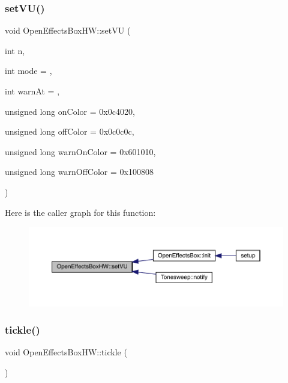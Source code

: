 \subsubsection{\texorpdfstring{set\+V\+U()}{setVU()}}
{\footnotesize\ttfamily void Open\+Effects\+Box\+H\+W\+::set\+VU (\begin{DoxyParamCaption}\item[{int}]{n,  }\item[{int}]{mode = {},  }\item[{int}]{warn\+At = {},  }\item[{unsigned long}]{on\+Color = {\ttfamily 0x0c4020},  }\item[{unsigned long}]{off\+Color = {\ttfamily 0x0c0c0c},  }\item[{unsigned long}]{warn\+On\+Color = {\ttfamily 0x601010},  }\item[{unsigned long}]{warn\+Off\+Color = {\ttfamily 0x100808} }\end{DoxyParamCaption})}

Here is the caller graph for this function\+:\nopagebreak
\begin{figure}[H]
\begin{center}
\leavevmode
\includegraphics[width=350pt]{class_open_effects_box_h_w_a9313d16771542c43c7782c19046caa8d_icgraph}
\end{center}
\end{figure}
\mbox{\label{class_open_effects_box_h_w_a4623ed8f605ab7d6a4abedf6879f06ac}} 
\subsubsection{\texorpdfstring{tickle()}{tickle()}}
{\footnotesize\ttfamily void Open\+Effects\+Box\+H\+W\+::tickle (\begin{DoxyParamCaption}{ }\end{DoxyParamCaption})}


